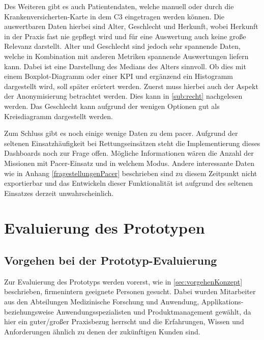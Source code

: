Des Weiteren gibt es auch Patientendaten, welche manuell oder durch die Krankenversicherten-Karte in dem \gls{C3} eingetragen werden können.
Die auswertbaren Daten hierbei sind Alter, Geschlecht und Herkunft, wobei Herkunft in der Praxis fast nie gepflegt wird und für eine Auswertung auch keine große Relevanz darstellt.
Alter und Geschlecht sind jedoch sehr spannende Daten, welche in Kombination mit anderen Metriken spannende Auswertungen liefern kann.
Dabei ist eine Darstellung des Medians des Alters sinnvoll. 
Ob dies mit einem Boxplot-Diagramm oder einer \gls{KPI} und ergänzend ein Histogramm dargestellt wird, soll später erörtert werden.
Zuerst muss hierbei auch der Aspekt der Anonymisierung betrachtet werden. 
Dies kann in \ref{sub:recht} nachgelesen werden.
Das Geschlecht kann aufgrund der wenigen Optionen gut als Kreisdiagramm dargestellt werden.

Zum Schluss gibt es noch einige wenige Daten zu dem \gls{pacer}.
Aufgrund der seltenen Einsatzhäufigkeit bei Rettungseinsätzen steht die Implementierung dieses Dashboards noch zur Frage offen.
Mögliche Informationen wären die Anzahl der Missionen mit Pacer-Einsatz und in welchem Modus. 
Andere interessante Daten wie in Anhang \ref{fragestellungenPacer} beschrieben sind zu diesem Zeitpunkt nicht exportierbar und das Entwickeln dieser Funktionalität ist aufgrund des seltenen Einsatzes derzeit unwahrscheinlich.


\section{Evaluierung  des Prototypen}
\label{sec:evaluierung}
\subsection{Vorgehen bei der Prototyp-Evaluierung}
\label{sub:vorgehenEvaluierung}
Zur Evaluierung des Prototyps werden vorerst, wie in \ref{sec:vorgehenKonzept} beschrieben, firmenintern geeignete Personen gesucht. 
Dabei wurden Mitarbeiter aus den Abteilungen Medizinische Forschung und Anwendung, Applikations- beziehungsweise Anwendungsspezialisten und Produktmanagement gewählt, da hier ein guter/großer Praxisbezug herrscht und die Erfahrungen, Wissen und Anforderungen ähnlich zu denen der zukünftigen Kunden sind.

